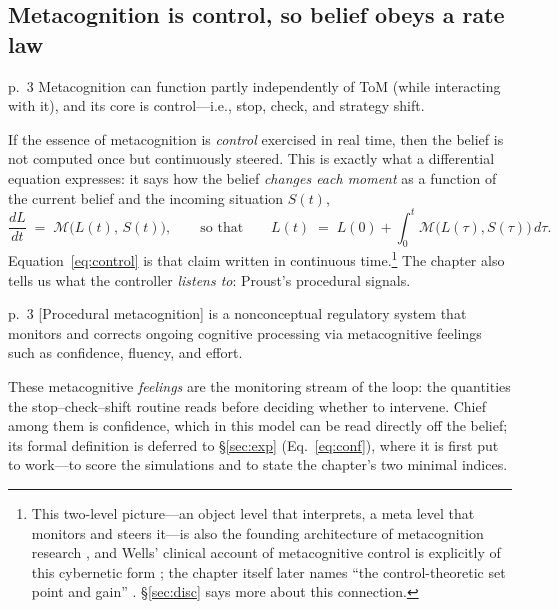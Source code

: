 \documentclass[11pt]{article}
\begin{document}
\subsection{Metacognition is control, so belief obeys a rate law}

\begin{fromtext}{p.~3}
Metacognition can function partly independently of ToM (while interacting with it), and its core is control---i.e., stop, check, and strategy shift.
\end{fromtext}

\noindent If the essence of metacognition is \emph{control} exercised in real time, then the belief is not computed once but continuously steered. This is exactly what a differential equation expresses: it says how the belief \emph{changes each moment} as a function of the current belief and the incoming situation $S(t)$,
\begin{equation}
\frac{dL}{dt} \;=\; \mathcal{M}\big(L(t),\,S(t)\big),
\qquad\text{so that}\qquad
L(t) \;=\; L(0) + \int_{0}^{t}\mathcal{M}\big(L(\tau),S(\tau)\big)\,d\tau .
\label{eq:control}
\end{equation}
Equation~\eqref{eq:control} is that claim written in continuous time.\footnote{This two-level picture---an object level that interprets, a meta level that monitors and steers it---is also the founding architecture of metacognition research \citep{NelsonNarens1990,ConantAshby1970}, and Wells' clinical account of metacognitive control is explicitly of this cybernetic form \citep{Wells2019}; the chapter itself later names ``the control-theoretic set point and gain'' \citep[p.~10]{HanEtAL2025}. \S\ref{sec:disc} says more about this connection.} The chapter also tells us what the controller \emph{listens to}: Proust's procedural signals.

\begin{fromtext}{p.~3}
[Procedural metacognition] is a nonconceptual regulatory system that monitors and corrects ongoing cognitive processing via metacognitive feelings such as confidence, fluency, and effort.
\end{fromtext}

\noindent These metacognitive \emph{feelings} are the monitoring stream of the loop: the quantities the stop--check--shift routine reads before deciding whether to intervene. Chief among them is confidence, which in this model can be read directly off the belief; its formal definition is deferred to \S\ref{sec:exp} (Eq.~\ref{eq:conf}), where it is first put to work---to score the simulations and to state the chapter's two minimal indices.
\end{document}
